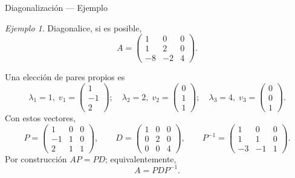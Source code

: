 \documentclass[aspectratio=169,11pt]{beamer}
\theoremstyle{remark}
\newtheorem{Ejem}[definicion]{Ejemplo}
\begin{document}
\begin{frame}[shrink=5]{Diagonalización — Ejemplo}
\footnotesize
\begin{Ejem}

Diagonalice, si es posible,
\[
A=\begin{pmatrix}1 & 0 & 0\\1 & 2 & 0\\-8 & -2 & 4\end{pmatrix}.
\]

\scriptsize
Una elección de pares propios es
\[
\lambda_1=1,\;v_1=\begin{pmatrix}1\\-1\\2\end{pmatrix};\quad \lambda_2=2,\;v_2=\begin{pmatrix}0\\1\\1\end{pmatrix};\quad \lambda_3=4,\;v_3=\begin{pmatrix}0\\0\\1\end{pmatrix}.
\]
Con estos vectores,
\[
P=\begin{pmatrix}1 & 0 & 0\\-1 & 1 & 0\\2 & 1 & 1\end{pmatrix},\qquad D=\begin{pmatrix}1 & 0 & 0\\0 & 2 & 0\\0 & 0 & 4\end{pmatrix},\qquad P^{-1}=\begin{pmatrix}1 & 0 & 0\\1 & 1 & 0\\-3 & -1 & 1\end{pmatrix}.
\]
Por construcción $AP=PD$; equivalentemente,
\[
\boxed{A=PDP^{-1}}.
\]

\end{Ejem}
\end{frame}
\end{document}
